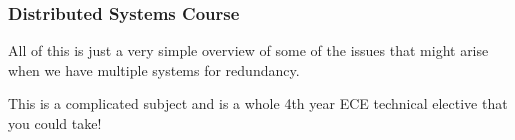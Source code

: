 \begin{frame}
\frametitle{Distributed Systems Course}

All of this is just a very simple overview of some of the issues that might arise when we have multiple systems for redundancy. 

This is a complicated subject and is a whole 4th year ECE technical elective that you could take!


\end{frame}



